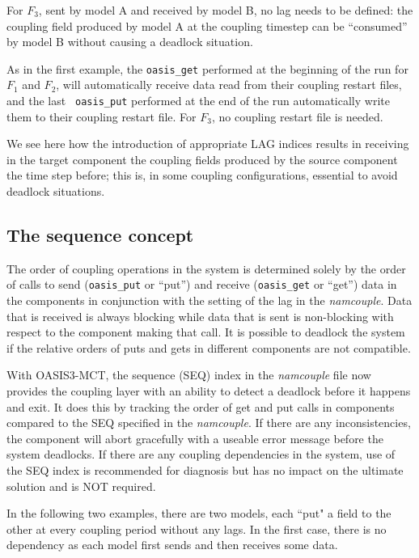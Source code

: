 \begin{enumerate}
  For $F_3$, sent by model A and received by model B, no lag needs to
  be defined: the coupling field produced by model A at the coupling
  timestep can be ``consumed'' by model B without causing a deadlock
  situation.

  As in the first example, the {\tt oasis\_get} performed at the
  beginning of the run for $F_1$ and $F_2$, will automatically receive
  data read from their coupling restart files, and the last {\tt
    oasis\_put} performed at the end of the run automatically write
  them to their coupling restart file. For $F_3$, no coupling restart
  file is needed.

  We see here how the introduction of appropriate LAG indices results
  in receiving in the target component the coupling fields produced by the
  source component the time step before; this is, in some coupling
  configurations, essential to avoid deadlock situations.

\end{enumerate}

\vspace{-0.3cm}
\subsection{The sequence concept}
\label{subsec_sec}

The order of coupling operations in the system is determined solely by
the order of calls to send ({\tt oasis\_put} or ``put'') and receive ({\tt oasis\_get} or ``get'') data in the components
in conjunction with the setting of the lag in the {\it namcouple}.
Data that is received is always blocking while data that is sent is non-blocking with respect to the component making that call.  It
is possible to deadlock the system if the relative orders of puts and
gets in different components are not compatible.

With OASIS3-MCT, the sequence (SEQ) index in the {\it namcouple} file
now provides the coupling layer with an ability to detect a deadlock
before it happens and exit.  It does this by tracking the order of get
and put calls in components compared to the SEQ specified in the {\it
  namcouple}.  If there are any inconsistencies, the component will abort
gracefully with a useable error message before the system deadlocks.
If there are any coupling dependencies in the system, use of the SEQ
index is recommended for diagnosis but has no impact on the ultimate
solution and is NOT required.

In the following two examples, there are two
models, each ``put" a field to the other at every coupling period
without any lags.  In the first case, there is no dependency as each
model first sends and then receives some data.

